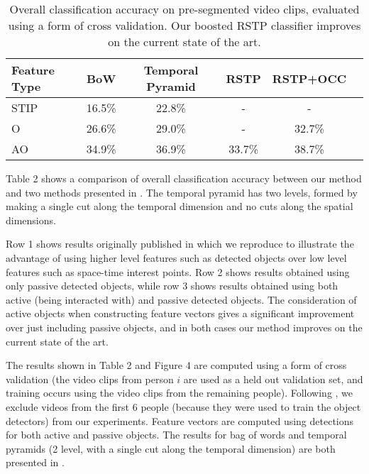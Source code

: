 \documentclass{bmvc2k}
\begin{document}
	\begin{table}
		\begin{center}
			\begin{tabular}{|l|c|c|c|c|c|}
				\hline
        Feature Type & BoW & Temporal Pyramid & RSTP & RSTP+OCC \\
				\hline\hline
        STIP & 16.5\% & 22.8\% & - & - \\ 
        \hline
        O & 26.6\% & 29.0\% & - & 32.7\%\\
        \hline
        AO & 34.9\% & 36.9\% & 33.7\% & 38.7\%\\
				\hline
			\end{tabular}
		\end{center}
		\caption{Overall classification accuracy on pre-segmented video clips,
    evaluated using a form of cross validation. Our boosted RSTP classifier
  improves on the current state of the art.}
	\end{table}
	
  Table 2 shows a comparison of overall classification accuracy between our
  method and two methods presented in \cite{Ramanan12}. The temporal pyramid
  has two levels, formed by making a single cut along the temporal
  dimension and no cuts along the spatial dimensions.
  
  Row 1 shows results originally published in \cite{Ramanan12} which we
  reproduce to illustrate the advantage of using higher level features such
  as detected objects over low level features such as space-time interest
  points.  Row 2 shows results
  obtained using only passive detected objects, while row 3 shows results obtained
  using both active (being interacted with) and passive detected objects.
  The consideration of active objects when constructing feature vectors
  gives a significant improvement over just including passive objects, and
  in both cases our method improves on the current state of the art.

	The results shown in Table 2 and Figure 4 are computed using a form of cross
	validation (the video clips from person $i$ are used as a held out validation set, and
	training occurs using the video clips from the remaining people).
  Following \cite{Ramanan12}, we exclude videos from the first 6 people
  (because they were used to train the object detectors) from our
  experiments.
  Feature vectors are computed using detections for both active and passive
  objects. The results for bag of words and temporal pyramids (2 level, with
  a single cut along the temporal dimension) are both presented in
  \cite{Ramanan12}.
  
\end{document}
